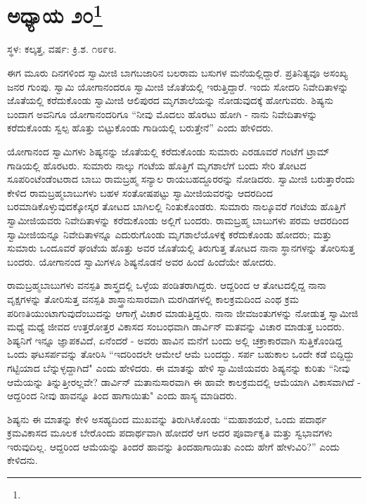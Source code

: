 \newpage

\chapter[ಅಧ್ಯಾಯ ೨೦]{ಅಧ್ಯಾಯ ೨೦\protect\footnote{}}

\begin{center}
ಸ್ಥಳ: ಕಲ್ಕತ್ತ, ವರ್ಷ: ಕ್ರಿ.ಶ. ೧೮೯೮.
\end{center}

ಈಗ ಮೂರು ದಿನಗಳಿಂದ ಸ್ವಾಮೀಜಿ ಬಾಗಬಜಾರಿನ ಬಲರಾಮ ಬಸುಗಳ ಮನೆಯಲ್ಲಿದ್ದಾರೆ. ಪ್ರತಿನಿತ್ಯವೂ ಅಸಂಖ್ಯ ಜನರ ಗುಂಪು. ಸ್ವಾಮಿ ಯೋಗಾನಂದರೂ ಸ್ವಾಮೀಜಿ ಜೊತೆಯಲ್ಲಿ ಇರುತ್ತಿದ್ದಾರೆ. ಇಂದು ಸೋದರಿ ನಿವೇದಿತಾಳನ್ನು ಜೊತೆಯಲ್ಲಿ ಕರೆದುಕೊಂಡು ಸ್ವಾಮೀಜಿ ಆಲಿಪುರದ ಮೃಗಶಾಲೆಯನ್ನು ನೋಡುವುದಕ್ಕೆ ಹೋಗುವರು. ಶಿಷ್ಯನು ಬಂದಾಗ ಅವನಿಗೂ ಯೋಗಾನಂದರಿಗೂ “ನೀವು ಮೊದಲು ಹೊರಟು ಹೋಗಿ - ನಾನು ನಿವೇದಿತಾಳನ್ನು ಕರೆದುಕೊಂಡು ಸ್ವಲ್ಪ ಹೊತ್ತು ಬಿಟ್ಟುಕೊಂಡು ಗಾಡಿಯಲ್ಲಿ ಬರುತ್ತೇನೆ” ಎಂದು ಹೇಳಿದರು.

ಯೋಗಾನಂದ ಸ್ವಾಮಿಗಳು ಶಿಷ್ಯನನ್ನು ಜೊತೆಯಲ್ಲಿ ಕರೆದುಕೊಂಡು ಸುಮಾರು ಎರಡೂವರೆ ಗಂಟೆಗೆ ಟ್ರಾಮ್ ಗಾಡಿಯಲ್ಲಿ ಹೊರಟರು. ಸುಮಾರು ನಾಲ್ಕು ಗಂಟೆಯ ಹೊತ್ತಿಗೆ ಮೃಗಶಾಲೆಗೆ ಬಂದು ಸೇರಿ ತೋಟದ ಸೂಪರಿಂಟೆಂಡೆಂಟರಾದ ಬಾಬು ರಾಮಬ್ರಹ್ಮ ಸನ್ಯಾಲ ರಾಯಬಹದ್ದೂರರನ್ನು ನೋಡಿದರು. ಸ್ವಾಮೀಜಿ ಬರುತ್ತಾರೆಂದು ಕೇಳಿದ ರಾಮಬ್ರಹ್ಮಬಾಬುಗಳು ಬಹಳ ಸಂತೋಷಪಟ್ಟು ಸ್ವಾಮೀಜಿಯವರನ್ನು ಆದರದಿಂದ ಬರಮಾಡಿಕೊಳ್ಳುವುದಕ್ಕೋಸ್ಕರ ತೋಟದ ಬಾಗಿಲಲ್ಲಿ ನಿಂತುಕೊಂಡರು. ಸುಮಾರು ನಾಲ್ಕೂವರೆ ಗಂಟೆಯ ಹೊತ್ತಿಗೆ ಸ್ವಾಮೀಜಿಯವರು ನಿವೇದಿತಾಳನ್ನು ಕರೆದುಕೊಂಡು ಅಲ್ಲಿಗೆ ಬಂದರು. ರಾಮಬ್ರಹ್ಮ ಬಾಬುಗಳು ಪರಮ ಆದರದಿಂದ ಸ್ವಾಮೀಜಿಯನ್ನೂ ನಿವೇದಿತಾಳನ್ನೂ ಎದುರುಗೊಂಡು ಮೃಗಶಾಲೆಯೊಳಕ್ಕೆ ಕರೆದುಕೊಂಡು ಹೋದರು; ಮತ್ತು ಸುಮಾರು ಒಂದೂವರೆ ಘಂಟೆಯ ಹೊತ್ತು ಅವರ ಜೊತೆಯಲ್ಲಿ ತಿರುಗುತ್ತ ತೋಟದ ನಾನಾ ಸ್ಥಾನಗಳನ್ನು ತೋರಿಸುತ್ತ ಬಂದರು. ಯೋಗಾನಂದ ಸ್ವಾಮಿಗಳೂ ಶಿಷ್ಯನೊಡನೆ ಅವರ ಹಿಂದೆ ಹಿಂದೆಯೇ ಹೋದರು.

ರಾಮಬ್ರಹ್ಮಬಾಬುಗಳು ವನಸ್ಪತಿ ಶಾಸ್ತ್ರದಲ್ಲಿ ಒಳ್ಳೆಯ ಪಂಡಿತರಾಗಿದ್ದರು. ಆದ್ದರಿಂದ ಆ ತೋಟದಲ್ಲಿದ್ದ ನಾನಾ ವೃಕ್ಷಗಳನ್ನು ತೋರಿಸುತ್ತ ವನಸ್ಪತಿ ಶಾಸ್ತ್ರಾನುಸಾರವಾಗಿ ಮರಗಿಡಗಳಲ್ಲಿ ಕಾಲಕ್ರಮದಿಂದ ಎಂಥ ಕ್ರಮ ಪರಿಣತಿಯುಂಟಾಗುವುದೆಂಬುದನ್ನು ಆಗಾಗ್ಗೆ ವಿಚಾರ ಮಾಡುತ್ತಿದ್ದರು. ನಾನಾ ಜೀವಜಂತುಗಳನ್ನು ನೋಡುತ್ತ ಸ್ವಾಮೀಜಿ ಮಧ್ಯೆ ಮಧ್ಯೆ ಜೀವದ ಉತ್ತರೋತ್ತರ ವಿಕಾಸದ ಸಂಬಂಧವಾಗಿ ಡಾರ್ವಿನ್ ಮತವನ್ನು ವಿಚಾರ ಮಾಡುತ್ತ ಬಂದರು. ಶಿಷ್ಯನಿಗೆ ಇನ್ನೂ ಜ್ಞಾಪಕವಿದೆ, ಏನೆಂದರೆ - ಅವರು ಹಾವಿನ ಮನೆಗೆ ಬಂದು ಅಲ್ಲಿ ಚಕ್ರಾಕಾರವಾಗಿ ಸುತ್ತಿಕೊಂಡಿದ್ದ ಒಂದು ಘಟಸರ್ಪವನ್ನು ತೋರಿಸಿ “ಇದರಿಂದಲೇ ಆಮೇಲೆ ಆಮೆ ಬಂದದ್ದು. ಸರ್ಪ ಬಹುಕಾಲ ಒಂದೇ ಕಡೆ ಬಿದ್ದಿದ್ದು ಗಟ್ಟಿಯಾದ ಬೆನ್ನುಳ್ಳದ್ದಾಗಿದೆ" ಎಂದು ಹೇಳಿದರು. ಈ ಮಾತನ್ನು ಹೇಳಿ ಸ್ವಾಮಿಜಿಯವರು ಶಿಷ್ಯನನ್ನು ಕುರಿತು “ನೀವು ಆಮೆಯನ್ನು ತಿನ್ನುತ್ತೀರಲ್ಲವೇ? ಡಾರ್ವಿನ್ ಮತಾನುಸಾರವಾಗಿ ಈ ಹಾವೇ ಕಾಲಕ್ರಮದಲ್ಲಿ ಆಮೆಯಾಗಿ ವಿಕಾಸವಾಗಿದೆ - ಆದ್ದರಿಂದ ನೀವು ಹಾವನ್ನೂ ತಿಂದ ಹಾಗಾಯಿತು" ಎಂದು ಹಾಸ್ಯ ಮಾಡಿದರು.

ಶಿಷ್ಯನು ಈ ಮಾತನ್ನು ಕೇಳಿ ಅಸಹ್ಯದಿಂದ ಮುಖವನ್ನು ತಿರುಗಿಸಿಕೊಂಡು “ಮಹಾಶಯರೆ, ಒಂದು ಪದಾರ್ಥ ಕ್ರಮವಿಕಾಸದ ಮೂಲಕ ಬೇರೊಂದು ಪದಾರ್ಥವಾಗಿ ಹೋದರೆ ಆಗ ಅದರ ಪೂರ್ವಾಕೃತಿ ಮತ್ತು ಸ್ವಭಾವಗಳು ಇರುವುದಿಲ್ಲ. ಆದ್ದರಿಂದ ಆಮೆಯನ್ನು ತಿಂದರೆ ಹಾವನ್ನು ತಿಂದಹಾಗಾಯಿತು ಎಂದು ಹೇಗೆ ಹೇಳುವಿರಿ?” ಎಂದು ಕೇಳಿದನು.

